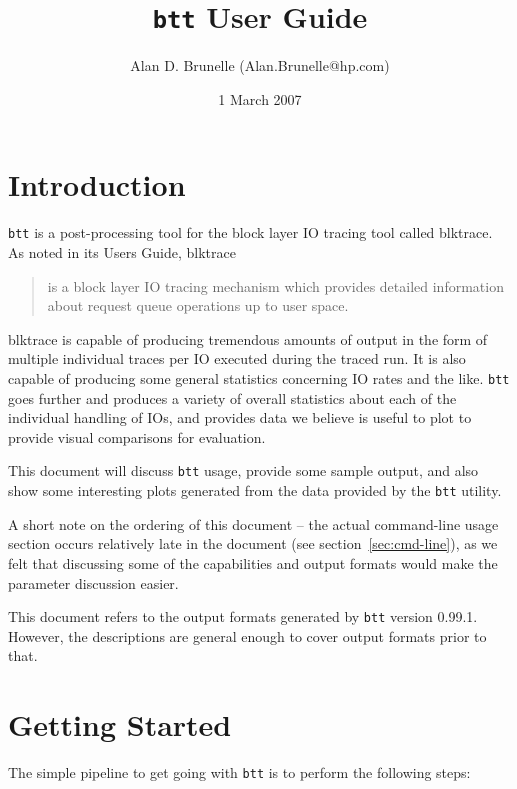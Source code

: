 \documentclass{article}
\title{\texttt{btt} User Guide}
\author{Alan D. Brunelle (Alan.Brunelle@hp.com)}
\date{1 March 2007}
\begin{document}
\maketitle
\section{\label{sec:intro}Introduction}

\texttt{btt} is a post-processing tool for the block layer IO tracing tool called blktrace. As noted in its Users Guide, blktrace 
  \begin{quotation}
    is a block layer IO tracing mechanism which provides detailed
    information about request queue operations up to user space.
  \end{quotation}

blktrace is capable of producing tremendous amounts of output in the
form of multiple individual traces per IO executed during the traced
run. It is also capable of producing some general statistics concerning
IO rates and the like. \texttt{btt} goes further and produces a variety
of overall statistics about each of the individual handling of IOs, and
provides data we believe is useful to plot to provide visual comparisons
for evaluation.

This document will discuss \texttt{btt} usage, provide some sample output,
and also show some interesting plots generated from the data provided
by the \texttt{btt} utility.

\bigskip
A short note on the ordering of this document -- the actual
command-line usage section occurs relatively late in the document (see
section~\ref{sec:cmd-line}), as we felt that discussing some of the
capabilities and output formats would make the parameter discussion
easier.

\bigskip
  This document refers to the output formats generated by \texttt{btt}
  version 0.99.1.  However, the descriptions are general enough to cover
  output formats prior to that.

\newpage\tableofcontents

\newpage\section{\label{sec:getting-started}Getting Started}

  The simple pipeline to get going with \texttt{btt} is to perform the
  following steps:
\end{document}
